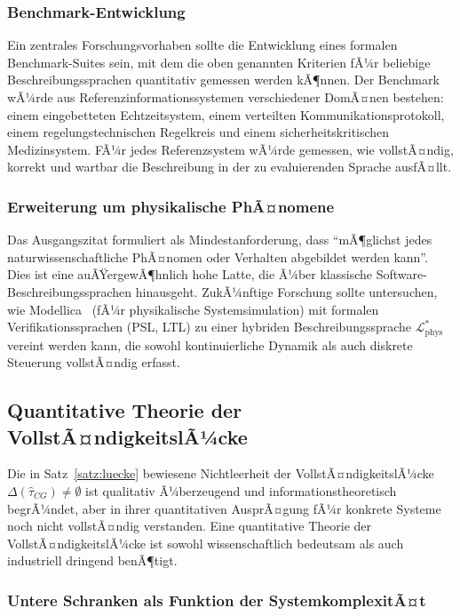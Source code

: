 ﻿\documentclass[a4paper,12pt]{article}
\theoremstyle{definition}
\begin{document}
\subsubsection{Benchmark-Entwicklung}

Ein zentrales Forschungsvorhaben sollte die Entwicklung eines formalen Benchmark-Suites
sein, mit dem die oben genannten Kriterien fÃ¼r beliebige Beschreibungssprachen quantitativ
gemessen werden kÃ¶nnen. Der Benchmark wÃ¼rde aus Referenzinformationssystemen verschiedener
DomÃ¤nen bestehen: einem eingebetteten Echtzeitsystem, einem verteilten Kommunikationsprotokoll,
einem regelungstechnischen Regelkreis und einem sicherheitskritischen Medizinsystem.
FÃ¼r jedes Referenzsystem wÃ¼rde gemessen, wie vollstÃ¤ndig, korrekt und wartbar die Beschreibung
in der zu evaluierenden Sprache ausfÃ¤llt.

\subsubsection{Erweiterung um physikalische PhÃ¤nomene}

Das Ausgangszitat formuliert als Mindestanforderung, dass \enquote{mÃ¶glichst jedes
naturwissenschaftliche PhÃ¤nomen oder Verhalten abgebildet werden kann}. Dies ist eine
auÃŸergewÃ¶hnlich hohe Latte, die Ã¼ber klassische Software-Beschreibungssprachen
hinausgeht. ZukÃ¼nftige Forschung sollte untersuchen, wie Modellica~\cite{modelica2014}
(fÃ¼r physikalische Systemsimulation) mit formalen Verifikationssprachen (PSL, LTL)
zu einer hybriden Beschreibungssprache $\mathcal{L}^*_{\text{phys}}$ vereint werden
kann, die sowohl kontinuierliche Dynamik als auch diskrete Steuerung vollstÃ¤ndig
erfasst.

\subsection{Quantitative Theorie der VollstÃ¤ndigkeitslÃ¼cke}

Die in Satz~\ref{satz:luecke} bewiesene Nichtleerheit der VollstÃ¤ndigkeitslÃ¼cke
$\Delta(\hat{\tau}_{CG}) \neq \emptyset$ ist qualitativ Ã¼berzeugend und informationstheoretisch
begrÃ¼ndet, aber in ihrer quantitativen AusprÃ¤gung fÃ¼r konkrete Systeme noch nicht
vollstÃ¤ndig verstanden. Eine quantitative Theorie der VollstÃ¤ndigkeitslÃ¼cke ist sowohl
wissenschaftlich bedeutsam als auch industriell dringend benÃ¶tigt.

\subsubsection{Untere Schranken als Funktion der SystemkomplexitÃ¤t}
\end{document}

